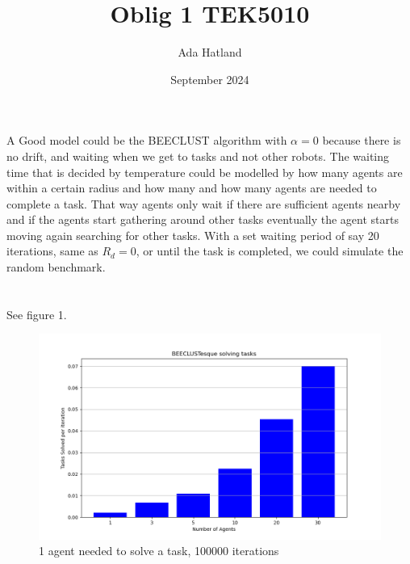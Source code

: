\documentclass{article}
\title{Oblig 1 TEK5010}
\author{Ada Hatland}
\date{September 2024}
\begin{document}
\maketitle

\section{}
A Good model could be the BEECLUST algorithm with $\alpha = 0$ because there is no drift, and waiting when we get to tasks and not other robots. 
The waiting time that is decided by temperature could be modelled by how many agents are within a certain radius and how many and how many agents are needed to complete a task. 
That way agents only wait if there are sufficient agents nearby and if the agents start gathering around other tasks eventually the agent starts moving again searching for other tasks. With a set waiting period of say 20 iterations, same as $R_d = 0$, or until the task is completed, we could simulate the random benchmark.



\section{}
See figure 1.

\begin{figure}
	\includegraphics[width=\textwidth]{1_capacity.png}
	\caption{1 agent needed to solve a task, 100000 iterations}
	\label{fig:environment}
\end{figure}
\end{document}
